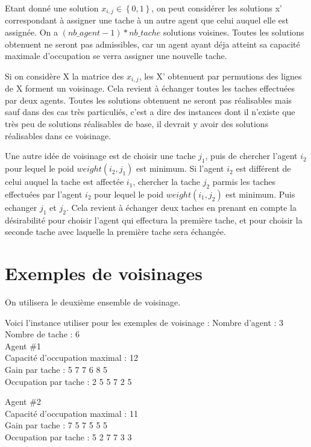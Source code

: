 \documentclass[a4paper,12pt,titlepage]{report}
\begin{document}
Etant donné une solution $x_{i,j}\in\left\{0,1\right\}$, on peut considérer les solutions x' correspondant à assigner une tache à un autre agent que celui auquel elle est assignée. On a $(nb\_agent-1)*nb\_tache$ solutions voisines. Toutes les solutions obtenuent ne seront pas admissibles, car un agent ayant déja atteint sa capacité maximale d'occupation se verra assigner une nouvelle tache.



Si on considère X la matrice des $x_{i,j}$, les X' obtenuent par permutions des lignes de X forment un voisinage. Cela revient à échanger toutes les taches effectuées par deux agents. Toutes les solutions obtenuent ne seront pas réalisables mais sauf dans des cas très particuliés, c'est a dire des instances dont il n'existe que très peu de solutions réalisables de base, il devrait y avoir des solutions réalisables dans ce voisinage.





Une autre idée de voisinage est de choisir une tache $j_{1}$, puis de chercher l'agent $i_{2}$ pour lequel le poid $weight(i_{2},j_{1})$ est minimum. Si l'agent $i_{2}$ est différent de celui auquel la tache est affectée $i_{1}$, chercher la tache $j_{2}$ parmis les taches effectuées par l'agent $i_{2}$ pour lequel le poid $weight(i_{1},j_{2})$ est minimum. Puis echanger $j_{1}$ et $j_{2}$.
Cela revient à échanger deux taches en prenant en compte la désirabilité pour choisir l'agent qui effectura la première tache, et pour choisir la seconde tache avec laquelle la première tache sera échangée.


\chapter{Exemples de voisinages}

On utilisera le deuxième ensemble de voisinage.

Voici l'instance utiliser pour les exemples de voisinage :
Nombre d'agent : 3\\
Nombre de tache : 6\\

Agent \#1\\
Capacité d'occupation maximal : 12\\
Gain par tache : 		5	7	7	6	8	5\\
Occupation par tache :	2	5	5	7	2	5

Agent \#2\\
Capacité d'occupation maximal : 11\\
Gain par tache : 		7	5	7	5	5	5\\
Occupation par tache :	5	2	7	7	3	3
\end{document}
